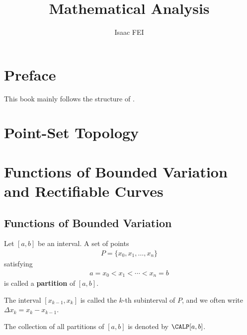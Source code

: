 \documentclass[thmcnt=section, color=blue, 12pt]{my-elegantbook}
\title{Mathematical Analysis}
\author{Isaac FEI}
\begin{document}
\maketitle


\frontmatter
\chapter*{Preface}

This book mainly follows the structure of \cite{apostolMathematicalAnalysisModern1974}.


\tableofcontents
\mainmatter



\chapter{Point-Set Topology}


\chapter{Functions of Bounded Variation and Rectifiable Curves}


\section{Functions of Bounded Variation}

\begin{definition}
	Let $[a, b]$ be an interval.
	A set of points
	\begin{align*}
		P = \{ x_0, x_1, \dots, x_n \}
	\end{align*}
	satisfying
	\begin{align*}
		a = x_0 < x_1 < \cdots < x_n = b
	\end{align*}
	is called a \textbf{partition} of $[a, b]$.

	The interval $[x_{k-1}, x_k]$ is called the $k$-th subinterval of $P$,
	and we often write $\Delta x_k = x_k - x_{k-1}$.

	The collection of all partitions of $[a, b]$ is denoted by $\CALP [a, b]$.
\end{definition}
\end{document}
